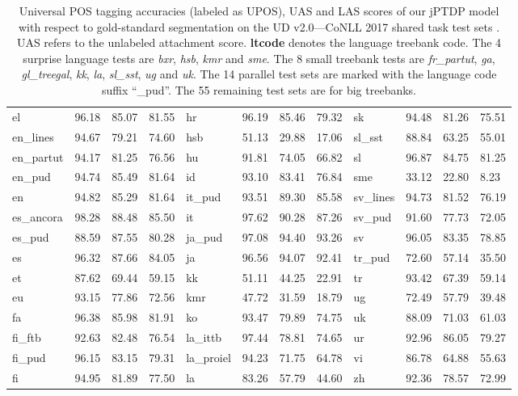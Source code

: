 \documentclass[11pt,letterpaper]{article}
\begin{document}
\begin{table*}[!t]
{\begin{tabular}{l|cll||l|cll||l|cll }
el &  96.18 &  85.07 &  81.55 & 
hr &  96.19 &  85.46 &  79.32 & 
sk &  94.48 &  81.26 &  75.51 \\ 
en\_lines &  94.67 &  79.21 &  74.60 & 
hsb &  51.13 &  29.88 &  17.06 & 
sl\_sst &  88.84 &  63.25 &  55.01 \\ 
en\_partut &  94.17 &  81.25 &  76.56 & 
hu &  91.81 &  74.05 &  66.82 & 
sl &  96.87 &  84.75 &  81.25 \\ 
en\_pud &  94.74 &  85.49 &  81.64 & 
id &  93.10 &  83.41 &  76.84 & 
sme &  33.12 &  22.80 &   8.23 \\ 
en &  94.82 &  85.29 &  81.64 & 
it\_pud &  93.51 &  89.30 &  85.58 & 
sv\_lines &  94.73 &  81.52 &  76.19 \\ 
es\_ancora &  98.28 &  88.48 &  85.50 & 
it &  97.62 &  90.28 &  87.26 & 
sv\_pud &  91.60 &  77.73 &  72.05 \\ 
es\_pud &  88.59 &  87.55 &  80.28 & 
ja\_pud &  97.08 &  94.40 &  93.26 & 
sv &  96.05 &  83.35 &  78.85 \\ 
es &  96.32 &  87.66 &  84.05 & 
ja &  96.56 &  94.07 &  92.41 & 
tr\_pud &  72.60 &  57.14 &  35.50 \\ 
et &  87.62 &  69.44 &  59.15 & 
kk &  51.11 &  44.25 &  22.91 & 
tr &  93.42 &  67.39 &  59.14 \\ 
eu &  93.15 &  77.86 &  72.56 & 
kmr &  47.72 &  31.59 &  18.79 & 
ug &  72.49 &  57.79 &  39.48 \\ 
fa &  96.38 &  85.98 &  81.91 & 
ko &  93.47 &  79.89 &  74.75 & 
uk &  88.09 &  71.03 &  61.03 \\ 
fi\_ftb &  92.63 &  82.48 &  76.54 & 
la\_ittb &  97.44 &  78.81 &  74.65 & 
ur &  92.96 &  86.05 &  79.27 \\ 
fi\_pud &  96.15 &  83.15 &  79.31 & 
la\_proiel &  94.23 &  71.75 &  64.78 & 
vi &  86.78 &  64.88 &  55.63 \\ 
fi &  94.95 &  81.89 &  77.50 & 
la &  83.26 &  57.79 &  44.60 & 
zh &  92.36 &  78.57 &  72.99 \\
\hline
\end{tabular}
}
\caption{Universal POS tagging accuracies (labeled as UPOS), UAS and LAS scores of our jPTDP model with respect to gold-standard segmentation on the UD v2.0---CoNLL 2017 shared task test sets \citep{ud20testdata}. UAS refers to the unlabeled attachment score. \textbf{ltcode} denotes the language treebank code. The  4 surprise language tests are \textit{bxr}, \textit{hsb}, \textit{kmr} and \textit{sme}. The 8 small treebank tests are \textit{fr\_partut}, \textit{ga}, \textit{gl\_treegal}, \textit{kk}, \textit{la}, \textit{sl\_sst}, \textit{ug} and \textit{uk}. The 14 parallel test sets are marked with the language code suffix ``\_pud''. The  55 remaining test sets are for big treebanks.}
\label{tab:ud2.0results}
\end{table*} 
\end{document}
